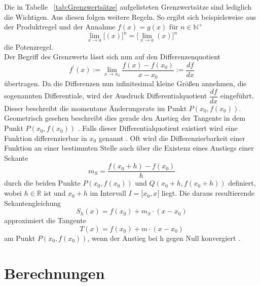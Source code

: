 \documentclass[11pt, a4paper]{report}
\begin{document}
Die in Tabelle ~\ref{tab:Grenzwertsätze} aufgelisteten Grenzwertsätze sind lediglich die Wichtigen. Aus diesen folgen weitere Regeln. So ergibt sich beispielsweise aus der Produktregel und der Annahme $f(x) = g(x)$ für $n \in \mathbb{N}^{+}$ 
\begin{equation}
\lim\limits_{x \to a} {\lbrack (x) \rbrack^{n}} = \lbrack \lim\limits_{x \to a} { (x) \rbrack^{n}} 
\end{equation}
die Potenzregel.
\\
Der Begriff des Grenzwerts lässt sich nun auf den Differenzenquotient
\begin{equation}
f^{\prime}(x):= \lim\limits_{x \to x_0}{\dfrac{f(x)-f(x_0)}{x-x_0}} := \dfrac{df}{dx}
\end{equation}
übertragen. Da die Differenzen nun infinitesimal kleine Größen annehmen, die sogenannten Differentiale, wird der Ausdruck Differentialquotient $\dfrac{df}{dx}$ eingeführt. Dieser beschreibt die momentane Änderungsrate im Punkt $P(x_0,f(x_0))$. Geometrisch gesehen beschreibt dies gerade den Anstieg der Tangente in dem Punkt $P(x_0,f(x_0))$ \cite[Seite 183]{FRITZSCHE.2020}. Falls dieser Differentialquotient existiert wird eine Funktion differenzierbar in $x_0$ genannt \cite[Seite 189]{Wendland.2005}.
Oft wird die Differenzierbarkeit einer Funktion an einer bestimmten Stelle auch über die Existenz eines Anstiegs einer Sekante
\begin{equation}
m_S = \frac{f(x_0+h)-f(x_0)}{h}
\end{equation}
durch die beiden Punkte $P(x_0,f(x_0))$ und $Q(x_0+h,f(x_0+h))$ definiert, wobei $h \in \mathbb{R}$ ist und $x_0+h$ im Intervall $I = \lbrack x_0,x \rbrack$ liegt.
Die daraus resultierende Sekantengleichung \cite[Seite 99 f.]{Deitmar.2017}
\begin{equation}
S_h(x) = f(x_0)+m_S \cdot (x-x_0)
\end{equation}
approximiert die Tangente \cite[192]{Wendland.2005}
\begin{equation}
T(x) = f(x_0)+m \cdot (x-x_0)
\end{equation}
am Punkt $P(x_0,f(x_0))$, wenn der Anstieg bei h gegen Null konvergiert \cite[184]{FRITZSCHE.2020}.


\chapter{Berechnungen}
\end{document}
